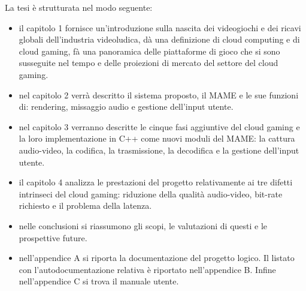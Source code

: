 
La tesi è strutturata nel modo seguente:
\begin{itemize}
	\item il capitolo 1 fornisce un'introduzione sulla nascita dei videogiochi e dei ricavi globali dell'industria videoludica, dà una definizione di cloud computing e di cloud gaming, fà una panoramica delle piattaforme di gioco che si sono susseguite nel tempo e delle proiezioni di mercato del settore del cloud gaming.
	\item nel capitolo 2 verrà descritto il sistema proposto, il MAME e le sue funzioni di: rendering, missaggio audio e gestione dell'input utente.
	\item nel capitolo 3 verranno descritte le cinque fasi aggiuntive del cloud gaming e la loro implementazione in C++ come nuovi moduli del MAME: la cattura audio-video, la codifica, la trasmissione, la decodifica e la gestione dell'input utente.
	\item il capitolo 4 analizza le prestazioni del progetto relativamente ai tre difetti intrinseci del cloud gaming: riduzione della qualità audio-video, bit-rate richiesto e il problema della latenza.
	\item nelle conclusioni si riassumono gli scopi, le valutazioni di questi e le prospettive future.
	\item nell'appendice A si riporta la documentazione del progetto logico. Il listato con l’autodocumentazione relativa è riportato nell'appendice B. Infine nell'appendice C si trova il manuale utente.
\end{itemize}
